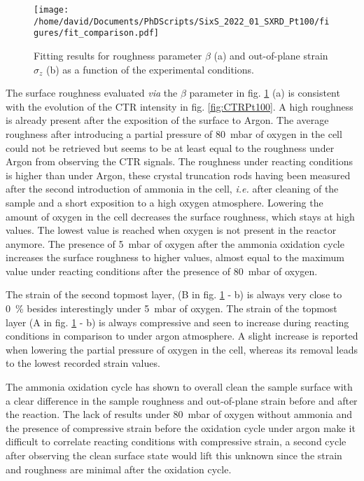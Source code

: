 \begin{figure}[!htb]
    \centering
    \texttt{[image: /home/david/Documents/PhDScripts/SixS\_2022\_01\_SXRD\_Pt100/figures/fit\_comparison.pdf]}
    \caption{
        Fitting results for roughness parameter $\beta$ (a) and out-of-plane strain $\sigma_z$ (b) as a function of the experimental conditions.
    }
    \label{fig:CTRFit100}
\end{figure}

The surface roughness evaluated \textit{via} the $\beta$ parameter in fig. \ref{fig:CTRFit100} (a) is consistent with the evolution of the CTR intensity in fig. \ref{fig:CTRPt100}.
A high roughness is already present after the exposition of the surface to Argon.
The average roughness after introducing a partial pressure of \qty{80}{\milli\bar} of oxygen in the cell could not be retrieved but seems to be at least equal to the roughness under Argon from observing the CTR signals.
The roughness under reacting conditions is higher than under Argon, these crystal truncation rods having been measured after the second introduction of ammonia in the cell, \textit{i.e.} after cleaning of the sample and a short exposition to a high oxygen atmosphere.
Lowering the amount of oxygen in the cell decreases the surface roughness, which stays at high values.
The lowest value is reached when oxygen is not present in the reactor anymore.
The presence of \qty{5}{\milli\bar} of oxygen after the ammonia oxidation cycle increases the surface roughness to higher values, almost equal to the maximum value under reacting conditions after the presence of \qty{80}{\milli\bar} of oxygen.

The strain of the second topmost layer, (B in fig. \ref{fig:CTRFit100} - b) is always very close to \qty{0}{\percent} besides interestingly under \qty{5}{\milli\bar} of oxygen.
The strain of the topmost layer (A in fig. \ref{fig:CTRFit100} - b) is always compressive and seen to increase during reacting conditions in comparison to under argon atmosphere.
A slight increase is reported when lowering the partial pressure of oxygen in the cell, whereas its removal leads to the lowest recorded strain values.

The ammonia oxidation cycle has shown to overall clean the sample surface with a clear difference in the sample roughness and out-of-plane strain before and after the reaction.
The lack of results under \qty{80}{\milli\bar} of oxygen without ammonia and the presence of compressive strain before the oxidation cycle under argon make it difficult to correlate reacting conditions with compressive strain, a second cycle after observing the clean surface state would lift this unknown since the strain and roughness are minimal after the oxidation cycle.

